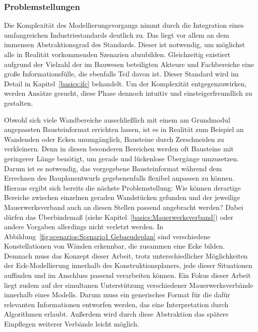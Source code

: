 \subsubsection*{Problemstellungen}
Die Komplexität des Modellierungsvorgangs nimmt durch die Integration eines umfangreichen Industriestandards deutlich zu.
Das liegt vor allem an dem immensen Abstraktionsgrad des Standards.
Dieser ist notwendig, um möglichst alle in Realität vorkommenden Szenarien abzubilden.
Gleichzeitig existiert aufgrund der Vielzahl der im Bauwesen beteiligten Akteure und Fachbereiche eine große Informationsfülle, die ebenfalls Teil davon ist.
Dieser Standard wird im Detail in Kapitel~\ref{basics:ifc} behandelt.
Um der Komplexität entgegenzuwirken, werden Ansätze gesucht, diese Phase dennoch intuitiv und einsteigerfreundlich zu gestalten.

Obwohl sich viele Wandbereiche ausschließlich mit einem am Grundmodul angepassten Bausteinformat errichten lassen, ist es in Realität zum Beispiel an Wandenden oder Ecken unumgänglich, Bausteine durch Zerschneiden zu verkleinern.
Denn in diesen besonderen Bereichen werden oft Bausteine mit geringerer Länge benötigt, um gerade und lückenlose Übergänge umzusetzen.
Darum ist es notwendig, das vorgegebene Bausteinformat während dem Errechnen des Bauplanentwurfs gegebenenfalls flexibel anpassen zu können.
Hieraus ergibt sich bereits die nächste Problemstellung:
Wie können derartige Bereiche zwischen einzelnen geraden Wandstücken gefunden und der jeweilige Mauerwerksverband auch an diesen Stellen passend angebracht werden?
Dabei dürfen das Überbindemaß (siehe Kapitel~\ref{basics:Mauerwerksverband}) oder andere Vorgaben allerdings nicht verletzt werden.
In Abbildung~\ref{fig:scenarios:Scenario1 Gebaeudeplan} sind verschiedene Konstellationen von Wänden erkennbar, die zusammen eine Ecke bilden.
Demnach muss das Konzept dieser Arbeit, trotz unterschiedlicher Möglichkeiten der Eck-Modellierung innerhalb des Konstruktionsplaners, jede dieser Situationen auffinden und im Anschluss passend verarbeiten können.
Ein Fokus dieser Arbeit liegt zudem auf der simultanen Unterstützung verschiedener Mauerwerksverbände innerhalb eines Modells.
Darum muss ein generisches Format für die dafür relevanten Informationen entworfen werden, das eine Interpretation durch Algorithmen erlaubt.
Außerdem wird durch diese Abstraktion das spätere Einpflegen weiterer Verbände leicht möglich.

